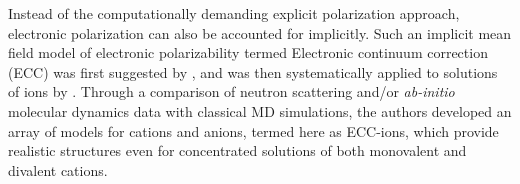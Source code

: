\documentclass[journal=jpcbfk,manuscript=article]{achemso}
\begin{document}
Instead of the computationally demanding explicit polarization approach, 
electronic polarization can also be accounted for implicitly.
Such an implicit mean field model of electronic polarizability 
termed Electronic continuum correction (ECC) 
was first suggested by \citet{leontyev09}, 
and was then systematically applied to solutions of ions by \citet{Pluharova2014, kohagen14, kohagen16, martinek17}. 
Through a comparison of neutron scattering and/or \emph{ab-initio} molecular dynamics data with classical MD simulations, 
the authors developed an array of models for cations and anions, termed here as ECC-ions,
which provide realistic structures even for concentrated solutions of both monovalent and divalent cations. 
\end{document}
